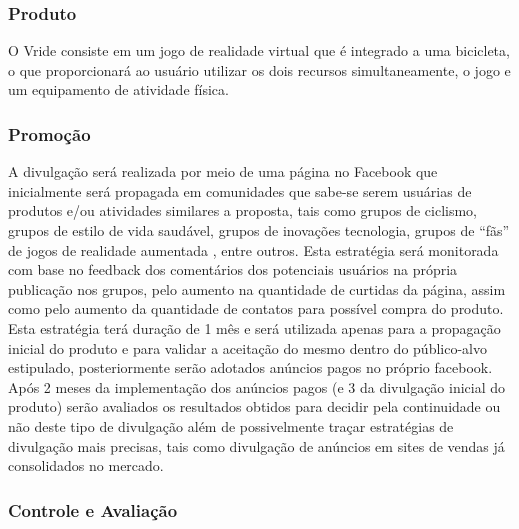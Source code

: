 \begin{apendicesenv}
\subsubsection{Produto}
	O Vride consiste em um jogo de realidade virtual que é integrado a uma bicicleta, o que proporcionará ao usuário utilizar os dois recursos simultaneamente, o jogo e um equipamento de atividade física. 
\subsubsection{Promoção}
 	A divulgação será realizada por meio de uma página no Facebook que inicialmente será propagada em comunidades que sabe-se serem usuárias de produtos e/ou atividades similares a proposta, tais como grupos de ciclismo, grupos de estilo de vida saudável, grupos de inovações tecnologia, grupos de “fãs” de jogos de realidade aumentada , entre outros. Esta estratégia será monitorada com base no feedback dos comentários dos potenciais usuários na própria publicação nos grupos, pelo aumento na quantidade de curtidas da página, assim como pelo aumento da quantidade de contatos para possível compra do produto. Esta estratégia terá duração de 1 mês e será utilizada apenas para a propagação inicial do produto e para validar a aceitação do mesmo dentro do público-alvo estipulado, posteriormente serão adotados anúncios pagos no próprio facebook. 
	 Após 2 meses da implementação dos anúncios pagos (e 3 da divulgação inicial do produto) serão avaliados os resultados obtidos para decidir pela continuidade ou não deste tipo de divulgação além de possivelmente traçar estratégias de divulgação mais precisas, tais como divulgação de anúncios em sites de vendas já consolidados no mercado.
 	
\subsubsection{Controle e Avaliação}
  
\end{apendicesenv}

